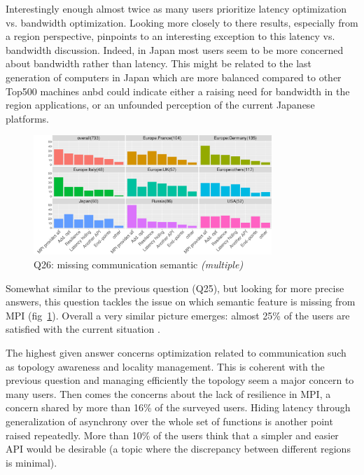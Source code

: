 \documentclass[conference,10pt,letterpaper]{IEEEtran}
\begin{document}
Interestingly enough almost twice as many users prioritize latency
optimization vs. bandwidth optimization. Looking more closely to there
results, especially from a region perspective, pinpoints to an
interesting exception to this latency vs. bandwidth discussion.
Indeed, in Japan most users seem to be more concerned about bandwidth
rather than latency. This might be related to the last generation of
computers in Japan which are more balanced compared to other Top500
machines anbd could indicate either a raising need for bandwidth in
the region applications, or an unfounded perception of the current
Japanese platforms.





\begin{figure}[htb]
\begin{center}
\includegraphics[width=9cm]{R-scripts/Q26.pdf}
\caption{Q26: missing communication semantic {\it(multiple)}}
\label{fig:com_sem}
\end{center}
\end{figure}

Somewhat similar to the previous question (Q25), but looking for more
precise answers, this question tackles the issue on which semantic
feature is missing from MPI (fig~\ref{fig:com_sem}). Overall a very
similar picture emerges: almost 25\% of the users are satisfied with
the current situation .

The highest given answer concerns optimization related to
communication such as topology awareness and locality management. This
is coherent with the previous question and managing efficiently the
topology seem a major concern to many users. Then comes the concerns
about the lack of resilience in MPI, a concern shared by more than
16\% of the surveyed users. Hiding latency through generalization of
asynchrony over the whole set of functions is another point raised
repeatedly. More than 10\% of the users think that a simpler and
easier API would be desirable (a topic where the discrepancy between
different regions is minimal).
\end{document}
